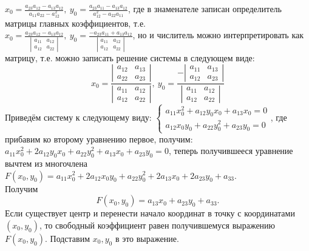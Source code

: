 $x_0 = \displaystyle \frac{a_{23}a_{12}-a_{13}a_{12}}{a_{11}a_{22} - a_{12}^2}, \ y_0 = \displaystyle \frac{a_{23}a_{11} -a_{13}a_{12}}{a_{12}^2 - a_{22} a_{11}}$, где в знаменателе записан определитель матрицы главных коэффициентов, т.е.\\
$x_0 = \displaystyle \frac{a_{23}a_{12}-a_{13}a_{12}}{\left| \begin{array}{cccc}
	a_{11} & a_{12}\\
	a_{12} & a_{22}
\end{array}\right|}, \ y_0 = \displaystyle \frac{-a_{23}a_{11} + a_{13}a_{12}}{\left| \begin{array}{cccc}
	a_{11} & a_{12}\\
	a_{12} & a_{22}
	\end{array}\right|}$, но и числитель можно интерпретировать как матрицу, т.е. можно записать решение системы в следующем виде:
$$x_0 = \displaystyle \frac{\left| \begin{array}{cccc}
	a_{12} & a_{13}\\
	a_{22} & a_{23}
\end{array}\right|}{\left| \begin{array}{cccc}
	a_{11} & a_{12}\\
	a_{12} & a_{22}
\end{array}\right|}, \ y_0 = \displaystyle \frac{-\left| \begin{array}{cccc}
	a_{11} & a_{13}\\
	a_{12} & a_{23}
\end{array}\right|}{\left| \begin{array}{cccc}
	a_{11} & a_{12}\\
	a_{12} & a_{22}
	\end{array}\right|}$$
Приведём систему к следующему виду:
$\begin{cases}
	a_{11}x_0^2 + a_{12}y_0x_0 + a_{13}x_0 = 0 \\
    a_{12}x_0y_0 + a_{22}y_0^2 + a_{23}y_0 = 0
\end{cases}$, где прибавим ко второму уравнению первое, получим: $a_{11}x_0^2 + 2a_{12}y_0x_0 + a_{22}y_0^2 + a_{13}x_0 + a_{23}y_0 = 0$, теперь получившееся уравнение вычтем из многочлена $F(x_0, y_0) = a_{11} x_0^2 + 2 a_{12}x_0y_0 + a_{22} y_0^2 + 2 a_{13}x_0 + 2 a_{23}y_0 + a_{33}$.\\
Получим $$F(x_0, y_0) = a_{13}x_0 + a_{23}y_0 + a_{33}.$$ Если существует центр и перенести начало координат в точку с координатами $(x_0, y_0)$, то свободный коэффициент равен получившемуся выражению $F(x_0, y_0)$.
Подставим $x_0, y_0$ в это выражение. 
